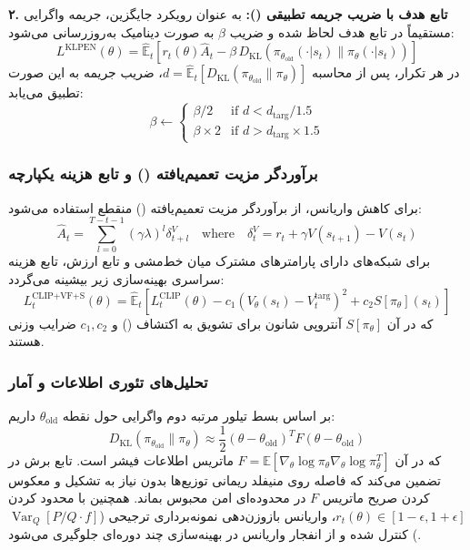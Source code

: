 \textbf{۲. تابع هدف با ضریب جریمه تطبیقی ():}
به عنوان رویکرد جایگزین، جریمه واگرایی  مستقیماً در تابع هدف لحاظ شده و ضریب $\beta$ به صورت دینامیک به‌روزرسانی می‌شود:
\begin{equation}
	L^{\text{KLPEN}}(\theta) = \hat{\mathbb{E}}_t \left[ r_t(\theta)\hat{A}_t - \beta \, D_{\text{KL}}\left(\pi_{\theta_{\text{old}}}(\cdot|s_t) \parallel \pi_\theta(\cdot|s_t)\right) \right]
\end{equation}
در هر تکرار، پس از محاسبه $d = \hat{\mathbb{E}}_t [D_{\text{KL}}(\pi_{\theta_{\text{old}}} \parallel \pi_\theta)]$، ضریب جریمه به این صورت تطبیق می‌یابد:
\begin{equation}
	\beta \leftarrow \begin{cases} 
		\beta / 2 & \text{if } d < d_{\text{targ}} / 1.5 \\ 
		\beta \times 2 & \text{if } d > d_{\text{targ}} \times 1.5 
	\end{cases}
\end{equation}

\subsubsection*{برآوردگر مزیت تعمیم‌یافته () و تابع هزینه یکپارچه}

برای کاهش واریانس، از برآوردگر مزیت تعمیم‌یافته () منقطع \cite{schulman2015high} استفاده می‌شود:
\begin{equation}
	\hat{A}_t = \sum_{l=0}^{T-t-1} (\gamma \lambda)^l \delta_{t+l}^V \quad \text{where} \quad \delta_t^V = r_t + \gamma V(s_{t+1}) - V(s_t)
\end{equation}
برای شبکه‌های دارای پارامترهای مشترک میان خط‌مشی و تابع ارزش، تابع هزینه سراسری بهینه‌سازی زیر بیشینه می‌گردد:
\begin{equation}
	L_t^{\text{CLIP+VF+S}}(\theta) = \hat{\mathbb{E}}_t \left[ L_t^{\text{CLIP}}(\theta) - c_1 \left( V_\theta(s_t) - V_t^{\text{targ}} \right)^2 + c_2 S[\pi_\theta](s_t) \right]
\end{equation}
که در آن $S[\pi_\theta]$ آنتروپی شانون برای تشویق به اکتشاف () و $c_1, c_2$ ضرایب وزنی هستند.

\subsubsection*{تحلیل‌های تئوری اطلاعات و آمار}

بر اساس بسط تیلور مرتبه دوم واگرایی  حول نقطه $\theta_{\text{old}}$ داریم:
\begin{equation}
	D_{\text{KL}}(\pi_{\theta_{\text{old}}} \parallel \pi_\theta) \approx \frac{1}{2} (\theta - \theta_{\text{old}})^T F (\theta - \theta_{\text{old}})
\end{equation}
که در آن $F = \mathbb{E} [\nabla_\theta \log \pi_\theta \nabla_\theta \log \pi_\theta^T]$ ماتریس اطلاعات فیشر است. تابع برش در  تضمین می‌کند که فاصله روی منیفلد ریمانی توزیع‌ها بدون نیاز به تشکیل و معکوس کردن صریح ماتریس $F$ در محدوده‌ای امن محبوس بماند. همچنین با محدود کردن $r_t(\theta) \in [1-\epsilon, 1+\epsilon]$، واریانس بازوزن‌دهی نمونه‌برداری ترجیحی ($\operatorname{Var}_{Q}[P/Q \cdot f]$) کنترل شده و از انفجار واریانس در بهینه‌سازی چند دوره‌ای جلوگیری می‌شود.

